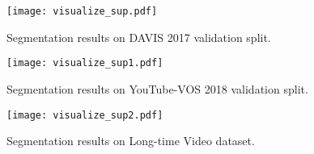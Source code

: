 \documentclass[10pt,twocolumn,letterpaper]{article}
\begin{document}
\begin{figure}[!ht]
	\centering
	\texttt{[image: visualize\_sup.pdf]}
	\vspace{-0.25in}
	\caption{Segmentation results on DAVIS 2017 validation split.}
	\label{fig:visualization1}
\end{figure}

\begin{figure}[!ht]
	\centering
	\texttt{[image: visualize\_sup1.pdf]}
	\vspace{-0.25in}
	\caption{Segmentation results on YouTube-VOS 2018 validation split.}
	\label{fig:visualization2}
\end{figure}

\begin{figure}[!ht]
	\centering
	\texttt{[image: visualize\_sup2.pdf]}
	\vspace{-0.25in}
	\caption{Segmentation results on Long-time Video dataset.}
	\label{fig:visualization3}
\end{figure}
\end{document}
